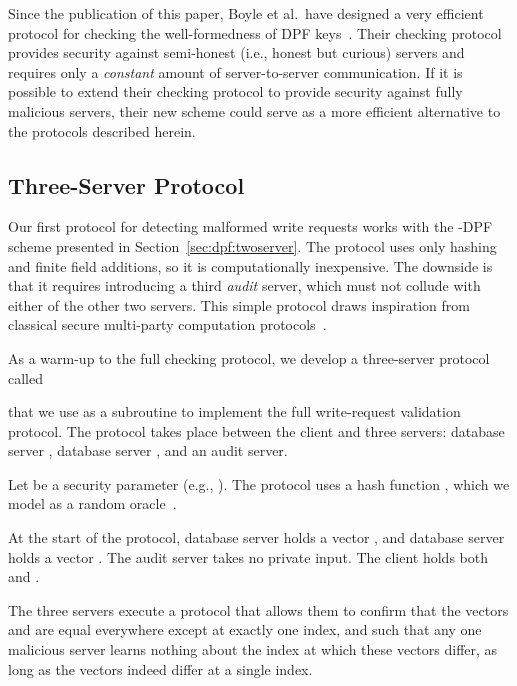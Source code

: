 \documentclass[10pt,twocolumn]{article}
\begin{document}
Since the publication of this paper, Boyle et al.~have designed a very
efficient protocol for checking the well-formedness of DPF
keys~\cite{boyle2016function}.
Their checking protocol provides security against semi-honest (i.e., honest but curious) servers
and requires only a \textit{constant} amount of server-to-server communication.
If it is possible to extend their checking protocol to provide security against fully malicious
servers, their new scheme could serve as a more efficient alternative to the protocols described herein.

\subsection{Three-Server Protocol}
\label{sec:disrupt:smc}

Our first protocol for detecting malformed write requests
works with the -DPF scheme presented in 
Section~\ref{sec:dpf:twoserver}.
The protocol uses only hashing and finite field additions, 
so it is computationally inexpensive.
The downside is that it requires introducing a third
{\em audit} server, which must not collude with either
of the other two servers.
This simple protocol draws inspiration from classical secure
multi-party computation protocols~\cite{fagin1996comparing,
goldreich1987play, yao1982protocols}.

As a warm-up to the full checking protocol, 
we develop a three-server protocol called

that we use as a subroutine 
to implement the full write-request validation protocol.
The  protocol takes place between 
the client and three servers: 
database server , database server , and an audit server.

Let  be a security parameter (e.g., ).  
The protocol uses a hash function 
, which we model as a random
oracle~\cite{bellare1993random}.

At the start of the protocol, database server  holds 
a vector , and database server  holds a vector
.
The audit server takes no private input.
The client holds both  and .

The three servers execute a protocol that allows them to confirm
that the vectors  and  are equal everywhere except at exactly one index, and
such that any one malicious server learns nothing about 
the index at which these vectors differ,
as long as the vectors indeed differ at a single index.
\end{document}
